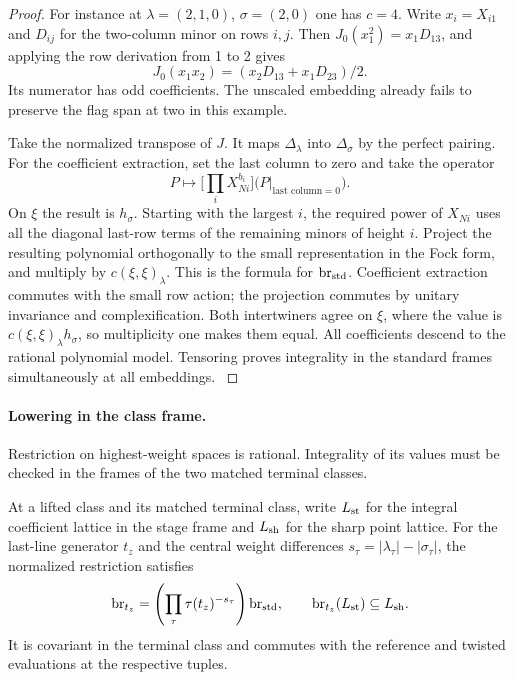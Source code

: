 \begin{proof}
For instance at \(\lambda=(2,1,0)\), \(\sigma=(2,0)\) one
has \(c=4\). Write \(x_i=X_{i1}\) and \(D_{ij}\) for the
two-column minor on rows \(i,j\). Then
\(J_0(x_1^2)=x_1D_{13}\), and applying the row derivation
from 1 to 2 gives
\[
 J_0(x_1x_2)=(x_2D_{13}+x_1D_{23})/2 .
\]
Its numerator has odd coefficients. The unscaled embedding
already fails to preserve the flag span at two in this example.

Take the normalized transpose of \(J\). It maps
\(\Delta_\lambda\) into \(\Delta_\sigma\) by the perfect
pairing. For the coefficient extraction, set the last column to zero and take the operator
\[
  P\longmapsto\Big[\prod_i X_{Ni}^{b_i}\Big]\big(P\big|_{\text{last column}=0}\big).
\]
 On \(\xi\) the result is
\(h_\sigma\). Starting with the largest \(i\), the required
power of \(X_{Ni}\) uses all the diagonal last-row terms of
the remaining minors of height \(i\). Project the resulting
polynomial orthogonally to the small representation in the
Fock form, and multiply by \(c(\xi,\xi)_\lambda\).
This is the formula for \(\mathrm{br}_{\rm std}\). Coefficient
extraction commutes with the small row action; the projection
commutes by unitary invariance and complexification. Both
intertwiners agree on \(\xi\), where the value is
\(c(\xi,\xi)_\lambda h_\sigma\), so multiplicity one makes
them equal. All coefficients descend to the rational
polynomial model. Tensoring proves integrality in the
standard frames simultaneously at all embeddings.
\label{cor:terminal-realization-2}
\end{proof}

\paragraph{Lowering in the class frame.}

Restriction on highest-weight spaces is rational. Integrality of its values must be checked in the frames of the two matched terminal classes.

\begin{lemma}
\label{lem:terminal-integral-class-frame}
At a lifted class and its matched terminal class, write \(L_{\rm st}\) for the integral coefficient lattice in the stage frame and \(L_{\rm sh}\) for the sharp point lattice. For the last-line generator \(t_z\) and the central weight differences \(s_\tau=|\lambda_\tau|-|\sigma_\tau|\), the normalized restriction satisfies
\[
 {\rm br}_{t_z}=\left(\prod_\tau\tau(t_z)^{-s_\tau}\right){\rm br}_{\rm std},\qquad {\rm br}_{t_z}(L_{\rm st})\subseteq L_{\rm sh}.
\]
 It is covariant in the terminal class and commutes
with the reference and twisted evaluations at the respective tuples.
\end{lemma}

